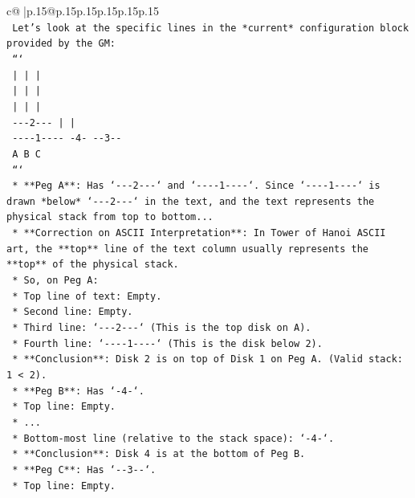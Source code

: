 \documentclass{article}
\begin{document}
{\begin{supertabular}{c@{$\;$}|p{.15\linewidth}@{}p{.15\linewidth}p{.15\linewidth}p{.15\linewidth}p{.15\linewidth}p{.15\linewidth}}
{{{\\ 
\texttt{    Let's look at the specific lines in the *current* configuration block provided by the GM:} \\
\texttt{    ```} \\
\texttt{        |         |         |    } \\
\texttt{        |         |         |    } \\
\texttt{        |         |         |    } \\
\texttt{     {-}{-}{-}2{-}{-}{-}      |         |    } \\
\texttt{     {-}{-}{-}{-}1{-}{-}{-}{-}    {-}4{-}      {-}{-}3{-}{-}  } \\
\texttt{        A         B         C    } \\
\texttt{    ```} \\
\texttt{    *   **Peg A**: Has `{-}{-}{-}2{-}{-}{-}` and `{-}{-}{-}{-}1{-}{-}{-}{-}`. Since `{-}{-}{-}{-}1{-}{-}{-}{-}` is drawn *below* `{-}{-}{-}2{-}{-}{-}` in the text, and the text represents the physical stack from top to bottom...} \\
\texttt{    *   **Correction on ASCII Interpretation**: In Tower of Hanoi ASCII art, the **top** line of the text column usually represents the **top** of the physical stack.} \\
\texttt{    *   So, on Peg A:} \\
\texttt{        *   Top line of text: Empty.} \\
\texttt{        *   Second line: Empty.} \\
\texttt{        *   Third line: `{-}{-}{-}2{-}{-}{-}` (This is the top disk on A).} \\
\texttt{        *   Fourth line: `{-}{-}{-}{-}1{-}{-}{-}{-}` (This is the disk below 2).} \\
\texttt{        *   **Conclusion**: Disk 2 is on top of Disk 1 on Peg A. (Valid stack: 1 < 2).} \\
\texttt{    *   **Peg B**: Has `{-}4{-}`.} \\
\texttt{        *   Top line: Empty.} \\
\texttt{        *   ...} \\
\texttt{        *   Bottom{-}most line (relative to the stack space): `{-}4{-}`.} \\
\texttt{        *   **Conclusion**: Disk 4 is at the bottom of Peg B.} \\
\texttt{    *   **Peg C**: Has `{-}{-}3{-}{-}`.} \\
\texttt{        *   Top line: Empty.} \\
}}}
\end{supertabular}}
\end{document}

